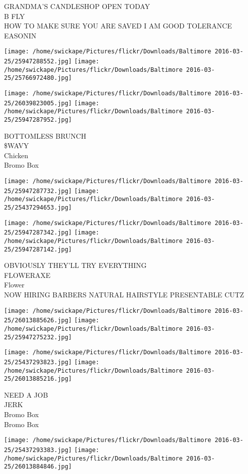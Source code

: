 \documentclass[10pt,letterpaper]{article}
\begin{document}
GRANDMA'S CANDLESHOP OPEN TODAY\\
B FLY\\
HOW TO MAKE SURE YOU ARE SAVED I AM GOOD TOLERANCE\\
EASONIN
\pagebreak

\texttt{[image: /home/swickape/Pictures/flickr/Downloads/Baltimore 2016-03-25/25947288552.jpg]}
\texttt{[image: /home/swickape/Pictures/flickr/Downloads/Baltimore 2016-03-25/25766972480.jpg]}

\texttt{[image: /home/swickape/Pictures/flickr/Downloads/Baltimore 2016-03-25/26039823005.jpg]}
\texttt{[image: /home/swickape/Pictures/flickr/Downloads/Baltimore 2016-03-25/25947287952.jpg]}

BOTTOMLESS BRUNCH\\
\$WAVY\\
Chicken\\
Bromo Box
\pagebreak

\texttt{[image: /home/swickape/Pictures/flickr/Downloads/Baltimore 2016-03-25/25947287732.jpg]}
\texttt{[image: /home/swickape/Pictures/flickr/Downloads/Baltimore 2016-03-25/25437294653.jpg]}

\texttt{[image: /home/swickape/Pictures/flickr/Downloads/Baltimore 2016-03-25/25947287342.jpg]}
\texttt{[image: /home/swickape/Pictures/flickr/Downloads/Baltimore 2016-03-25/25947287142.jpg]}

OBVIOUSLY THEY'LL TRY EVERYTHING\\
FLOWERAXE\\
Flower\\
NOW HIRING BARBERS NATURAL HAIRSTYLE PRESENTABLE CUTZ
\pagebreak

\texttt{[image: /home/swickape/Pictures/flickr/Downloads/Baltimore 2016-03-25/26013885626.jpg]}
\texttt{[image: /home/swickape/Pictures/flickr/Downloads/Baltimore 2016-03-25/25947275232.jpg]}

\texttt{[image: /home/swickape/Pictures/flickr/Downloads/Baltimore 2016-03-25/25437293823.jpg]}
\texttt{[image: /home/swickape/Pictures/flickr/Downloads/Baltimore 2016-03-25/26013885216.jpg]}

NEED A JOB\\
JERK\\
Bromo Box\\
Bromo Box
\pagebreak

\texttt{[image: /home/swickape/Pictures/flickr/Downloads/Baltimore 2016-03-25/25437293383.jpg]}
\texttt{[image: /home/swickape/Pictures/flickr/Downloads/Baltimore 2016-03-25/26013884846.jpg]}
\end{document}
